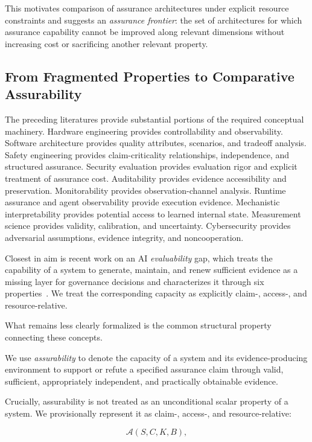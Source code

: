 This motivates comparison of assurance architectures under explicit resource constraints and suggests an \emph{assurance frontier}:
the set of architectures for which assurance capability cannot be improved along relevant dimensions without increasing cost or sacrificing another relevant property.

\subsection{From Fragmented Properties to Comparative Assurability}

The preceding literatures provide substantial portions of the required conceptual machinery.
Hardware engineering
provides controllability and observability.
Software architecture provides quality attributes, scenarios, and tradeoff analysis.
Safety engineering provides claim-criticality relationships, independence, and structured assurance.
Security evaluation provides evaluation rigor and explicit treatment of assurance cost.
Auditability provides evidence accessibility and preservation.
Monitorability provides observation-channel analysis.
Runtime assurance and agent observability provide execution evidence.
Mechanistic interpretability provides potential access to learned internal state.
Measurement science provides validity, calibration, and uncertainty.
Cybersecurity provides adversarial assumptions, evidence integrity, and noncooperation.

Closest in aim is recent work on an AI \emph{evaluability} gap,
which treats the capability of a system to generate, maintain, and renew sufficient evidence
as a missing layer for governance decisions
and characterizes it through six properties~\cite{srivastava2026evaluability}.
We treat the corresponding capacity as explicitly claim-, access-, and resource-relative.

What remains less clearly formalized is the common structural property connecting these concepts.

We use \emph{assurability} to denote the capacity of a system and its evidence-producing environment to
support or refute a specified assurance claim through valid, sufficient, appropriately independent, and practically obtainable evidence.

Crucially, assurability is not treated as an unconditional scalar property of a system.
We provisionally represent it as claim-, access-, and resource-relative:

\begin{equation}
  \mathcal{A}(S,C,K,B),
\end{equation}


